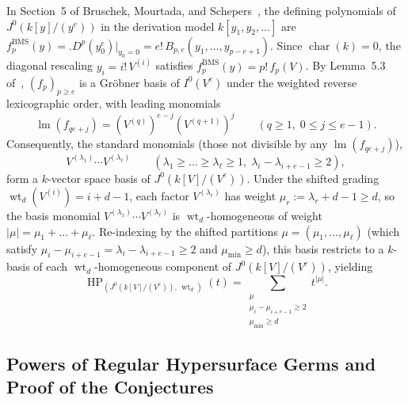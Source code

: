 \documentclass[a4paper, 12pt]{amsart}
\theoremstyle{remark}
\begin{document}
In Section~5 of Bruschek, Mourtada, and Schepers~\cite{bruschek_arc_2013},
the defining polynomials of $J^0(k[y]/(y^e))$ in the derivation model $k[y_1, y_2, \dots]$ are $f_p^{\mathrm{BMS}}(y) = \bigl.D^p(y_0^e)\bigr|_{y_0 = 0} = e!\,B_{p, e}(y_1, \dots, y_{p - e + 1})$.
Since $\operatorname{char}(k) = 0$,
the diagonal rescaling $y_i = i!\,V^{(i)}$ satisfies $f_p^{\mathrm{BMS}}(y) = p!\,f_p(V)$.
By Lemma~5.3 of~\cite{bruschek_arc_2013},
$(f_p)_{p \ge e}$ is a Gröbner basis of $I^0(V^e)$ under the weighted reverse lexicographic order,
with leading monomials
\begin{equation}
  \label{eq:shifted-leading-monomials}
  \operatorname{lm}(f_{qe + j}) = (V^{(q)})^{e - j} (V^{(q + 1)})^j \qquad (q \ge 1, \; 0 \le j \le e - 1).
\end{equation}
Consequently,
the standard monomials (those not divisible by any $\operatorname{lm}(f_{qe + j})$),
\begin{equation*}
  V^{(\lambda_1)} \cdots V^{(\lambda_\ell)} \qquad (\lambda_1 \ge \dots \ge \lambda_\ell \ge 1, \; \lambda_i - \lambda_{i + e - 1} \ge 2),
\end{equation*}
form a $k$-vector space basis of $J^0(k[V]/(V^e))$.
Under the shifted grading $\operatorname{wt}_d(V^{(i)}) = i + d - 1$,
each factor $V^{(\lambda_r)}$ has weight $\mu_r := \lambda_r + d - 1 \ge d$,
so the basis monomial $V^{(\lambda_1)} \cdots V^{(\lambda_\ell)}$ is $\operatorname{wt}_d$-homogeneous of weight $|\mu| = \mu_1 + \dots + \mu_\ell$.
Re-indexing by the shifted partitions $\mu = (\mu_1, \dots, \mu_\ell)$ (which satisfy $\mu_i - \mu_{i + e - 1} = \lambda_i - \lambda_{i + e - 1} \ge 2$ and $\mu_{\mathrm{min}} \ge d$),
this basis restricts to a $k$-basis of each $\operatorname{wt}_d$-homogeneous component of $J^0(k[V]/(V^e))$,
yielding
\begin{equation}
  \label{eq:tau-HP-BnN}
  \operatorname{HP}_{\left(J^0(k[V]/(V^e)), \, \operatorname{wt}_d\right)}(t) = \sum_{\substack{\mu \\ \mu_i - \mu_{i + e - 1} \ge 2 \\ \mu_{\mathrm{min}} \ge d}} t^{|\mu|}.
\end{equation}

\subsection{Powers of Regular Hypersurface Germs and Proof of the Conjectures}
\label{subsec:normal-crossings-proof}
\label{subsec:regular-hypersurface-germs}
\end{document}
